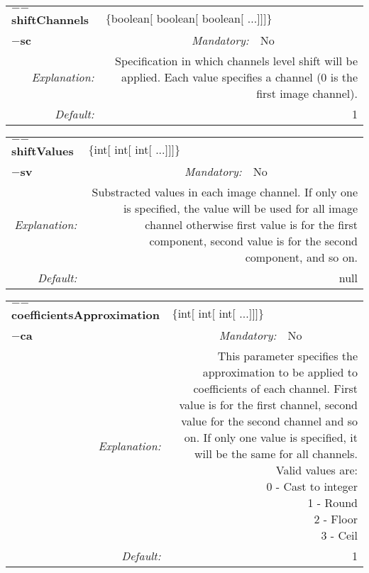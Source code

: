 \begin{center}\begin{tabular}{|rr|rlrl|}
\hline
\multicolumn{2}{|l|}{\textbf{$-$$-$shiftChannels}} & \multicolumn{4}{|l|}{$\{$boolean$[$ boolean$[$ boolean$[$ ...$]$$]$$]$$\}$} \\
\cline{3-6}
\multicolumn{2}{|l|}{\textbf{$-$sc}} & \emph{Mandatory:} & No & &  \\
\hline
\emph{Explanation:} & \multicolumn{5}{|p{12cm}|}{Specification in which channels level shift will be applied. Each value specifies a channel (0 is the first image channel).} \\
\hline
\emph{Default:} & \multicolumn{5}{|p{12cm}|}{1 } \\
\hline
\end{tabular}\end{center}
\begin{center}\begin{tabular}{|rr|rlrl|}
\hline
\multicolumn{2}{|l|}{\textbf{$-$$-$shiftValues}} & \multicolumn{4}{|l|}{$\{$int$[$ int$[$ int$[$ ...$]$$]$$]$$\}$} \\
\cline{3-6}
\multicolumn{2}{|l|}{\textbf{$-$sv}} & \emph{Mandatory:} & No & &  \\
\hline
\emph{Explanation:} & \multicolumn{5}{|p{12cm}|}{Substracted values in each image channel. If only one is specified, the value will be used for all image channel otherwise first value is for the first component, second value is for the second component, and so on.} \\
\hline
\emph{Default:} & \multicolumn{5}{|p{12cm}|}{null} \\
\hline
\end{tabular}\end{center}
\begin{center}\begin{tabular}{|rr|rlrl|}
\hline
\multicolumn{2}{|l|}{\textbf{$-$$-$coefficientsApproximation}} & \multicolumn{4}{|l|}{$\{$int$[$ int$[$ int$[$ ...$]$$]$$]$$\}$} \\
\cline{3-6}
\multicolumn{2}{|l|}{\textbf{$-$ca}} & \emph{Mandatory:} & No & &  \\
\hline
\emph{Explanation:} & \multicolumn{5}{|p{12cm}|}{This parameter specifies the approximation to be applied to coefficients of each channel. First value is for the first channel, second value for the second channel and so on. If only one value is specified, it will be the same for all channels. Valid values are:\newline 0 - Cast to integer  \newline 1 - Round  \newline 2 - Floor  \newline 3 - Ceil } \\
\hline
\emph{Default:} & \multicolumn{5}{|p{12cm}|}{1 } \\
\hline
\end{tabular}\end{center}
